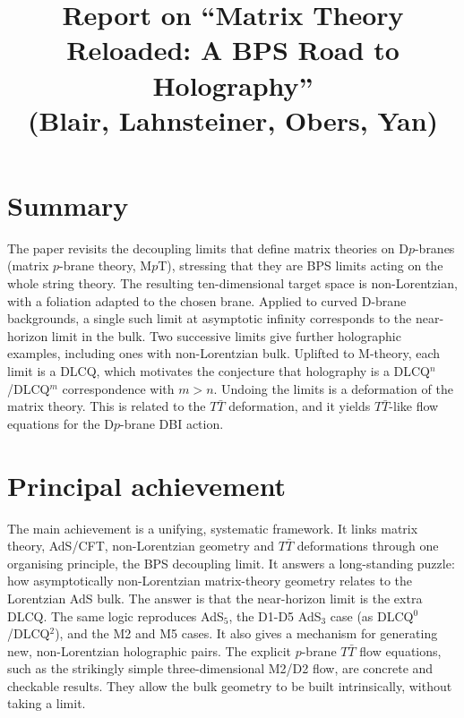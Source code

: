 \documentclass[11pt]{article}
\title{Report on ``Matrix Theory Reloaded: A BPS Road to Holography''\\(Blair, Lahnsteiner, Obers, Yan)}
\date{}
\begin{document}
\maketitle

\section*{Summary}
The paper revisits the decoupling limits that define matrix theories on D$p$-branes (matrix $p$-brane theory, M$p$T), stressing that they are BPS limits acting on the whole string theory. The resulting ten-dimensional target space is non-Lorentzian, with a foliation adapted to the chosen brane. Applied to curved D-brane backgrounds, a single such limit at asymptotic infinity corresponds to the near-horizon limit in the bulk. Two successive limits give further holographic examples, including ones with non-Lorentzian bulk. Uplifted to M-theory, each limit is a DLCQ, which motivates the conjecture that holography is a DLCQ$^n$/DLCQ$^m$ correspondence with $m>n$. Undoing the limits is a deformation of the matrix theory. This is related to the $T\bar T$ deformation, and it yields $T\bar T$-like flow equations for the D$p$-brane DBI action.

\section{Principal achievement}
The main achievement is a unifying, systematic framework. It links matrix theory, AdS/CFT, non-Lorentzian geometry and $T\bar T$ deformations through one organising principle, the BPS decoupling limit. It answers a long-standing puzzle: how asymptotically non-Lorentzian matrix-theory geometry relates to the Lorentzian AdS bulk. The answer is that the near-horizon limit is the extra DLCQ. The same logic reproduces AdS$_5$, the D1-D5 AdS$_3$ case (as DLCQ$^0$/DLCQ$^2$), and the M2 and M5 cases. It also gives a mechanism for generating new, non-Lorentzian holographic pairs. The explicit $p$-brane $T\bar T$ flow equations, such as the strikingly simple three-dimensional M2/D2 flow, are concrete and checkable results. They allow the bulk geometry to be built intrinsically, without taking a limit.
\end{document}
